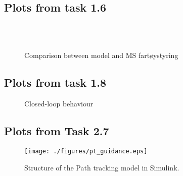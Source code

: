 \subsection{Plots from task 1.6}
\begin{figure}[h!]

\center
{}
\\
\\
\caption{Comparison between model and MS fart\o ystyring \label{fig:opg1_6}}
\label{fig:opg14}
\end{figure}

\newpage
\subsection{Plots from task 1.8}
\begin{figure}[h!]

\center
{}
\caption{Closed-loop behaviour \label{fig:opg1_8}} 
\end{figure}

\newpage
\subsection{Plots from Task 2.7}
\begin{figure}[h!] 
	\center 
	\texttt{[image: ./figures/pt\_guidance.eps]}
	\caption{Structure of the Path tracking model in Simulink.} 
	\label{fig:path_track_simulink_model}
\end{figure}
